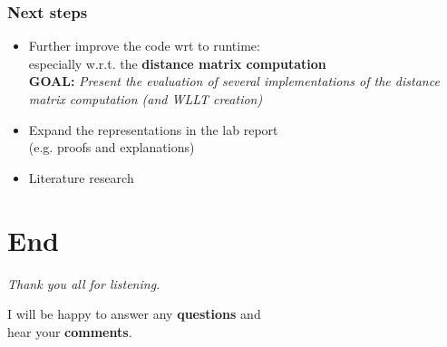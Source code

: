 \begin{frame}
\frametitle{Next steps}
	\begin{itemize}
		\item Further improve the code wrt to runtime:\\
		especially w.r.t. the \textbf{distance matrix computation}\\
		\textbf{GOAL:} \textit{Present the evaluation of several implementations of the distance matrix computation (and WLLT creation)}\newline
		\item Expand the representations in the lab report\\
		(e.g. proofs and explanations)\newline
		\item Literature research
	\end{itemize}	
\end{frame}

\section{End}
\begin{frame}[c]
	\centering %
	\begin{huge}
		\emph{Thank you all for listening.}\\
	\end{huge}
	\vspace{2 cm}
	I will be happy to answer any \textbf{questions} and\\
	hear your \textbf{comments}.
\end{frame}

